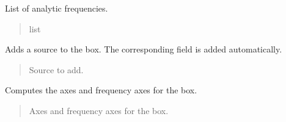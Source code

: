 \documentclass[letterpaper,10pt,english]{sphinxmanual}
\begin{document}
\begin{fulllineitems}
\begin{fulllineitems}
\begin{quote}
\begin{description}
\end{description}\end{quote}

\end{fulllineitems}


\begin{fulllineitems}
\label{\detokenize{source/Box:Box.Box.analytic_frequencies}}
\pysigstartsignatures
\pysigline
{}
\pysigstopsignatures
\sphinxAtStartPar
List of analytic frequencies.
\begin{quote}\begin{description}
\sphinxAtStartPar
list

\end{description}\end{quote}

\end{fulllineitems}



\begin{fulllineitems}
\label{\detokenize{source/Box:Box.Box.add_source}}
\pysigstartsignatures
\pysiglinewithargsret
{}
{}
{}
\pysigstopsignatures
\sphinxAtStartPar
Adds a source to the box. The corresponding field is added automatically.
\begin{quote}\begin{description}
\sphinxAtStartPar
{} \textendash{} Source to add.

\end{description}\end{quote}

\end{fulllineitems}


\begin{fulllineitems}
\label{\detokenize{source/Box:Box.Box.compute_axes}}
\pysigstartsignatures
\pysiglinewithargsret
{}
{}
{}
\pysigstopsignatures
\sphinxAtStartPar
Computes the axes and frequency axes for the box.
\begin{quote}\begin{description}
\sphinxAtStartPar
Axes and frequency axes for the box.


\end{description}
\end{quote}
\end{fulllineitems}
\end{fulllineitems}
\end{document}
